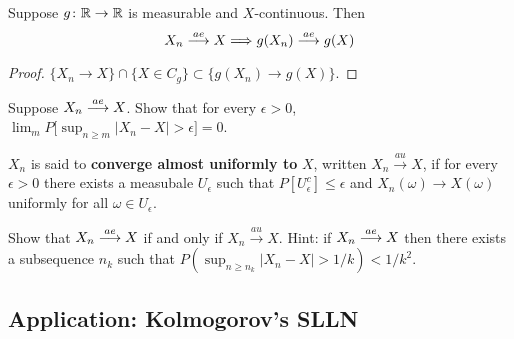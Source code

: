 \begin{theorem}
Suppose $g\colon\Bbb R\rightarrow\Bbb R$ is measurable and $X$-continuous. Then
\[X_n \overset{\small ae} \longrightarrow X \Longrightarrow g(X_n) \overset{\small ae} \longrightarrow g(X)\]
\end{theorem}
\begin{proof}$\{X_n \rightarrow X\} \cap \{ X\in C_g\} \subset \{g(X_n) \rightarrow g(X)\}$.
\end{proof}




\begin{exercise}
Suppose $X_n\overset{\small ae} \longrightarrow X$. Show that for every $\epsilon>0$, $\lim_m P\bigl[ \sup_{n\geq m} |X_n - X|>\epsilon \bigr]=0$.
\end{exercise}
\begin{exerciseproof}
\end{exerciseproof}

\begin{definition}
$X_n$ is said to {\bf converge almost uniformly to } $X$, written $X_n\overset{au}\longrightarrow X$, if for every $\epsilon>0$ there exists a measubale $U_\epsilon$ such that $P[U_\epsilon^c]\leq \epsilon$ and $X_n(\omega)\rightarrow X(\omega)$ uniformly for all $\omega \in U_\epsilon$.
\end{definition}

\begin{exercise}
Show that $X_n\overset{\small ae} \longrightarrow X$ if and only if $X_n\overset{au}\longrightarrow X$. Hint: if $X_n\overset{\small ae} \longrightarrow X$ then there exists a subsequence $n_k$ such that $P(\sup_{n\geq n_k}|X_n - X|> 1/k)< 1/k^2$.
\end{exercise}







%
%
\subsection{Application: Kolmogorov's SLLN}



